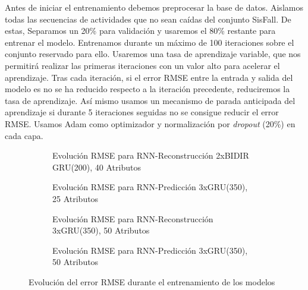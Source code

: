 Antes de iniciar el entrenamiento debemos preprocesar la base de datos. Aislamos todas las secuencias de actividades que no sean caídas del conjunto SisFall. De estas, Separamos un 20\% para validación y usaremos el 80\% restante para entrenar el modelo. Entrenamos durante un máximo de 100 iteraciones sobre el conjunto reservado para ello. Usaremos una tasa de aprendizaje variable, que nos permitirá realizar las primeras iteraciones con un valor alto para acelerar el aprendizaje. Tras cada iteración, si el error RMSE entre la entrada y salida del modelo es no se ha reducido respecto a la iteración precedente, reduciremos la tasa de aprendizaje. Así mismo usamos un mecanismo de parada anticipada del aprendizaje si durante 5 iteraciones seguidas no se consigue reducir el error RMSE. Usamos Adam como optimizador y normalización por \textit{dropout} (20\%) en cada capa. 


\begin{figure}[h!t]
  \centering
  \begin{subfigure}[b]{0.48\textwidth}
      \centering
      \caption{\footnotesize \label{fig:rnnTrain:recon:bidir:40}Evolución RMSE para RNN-Reconstrucción 2xBIDIR GRU(200), 40 Atributos}
  \end{subfigure}
\hfill
  \begin{subfigure}[b]{0.48\textwidth}
      \centering
      \caption{\footnotesize \label{fig:rnnTrain:predict:25}Evolución RMSE para RNN-Predicción 3xGRU(350), 25 Atributos\\}
  \end{subfigure}
  
  \begin{subfigure}[b]{0.49\textwidth}
      \centering
      \caption{\footnotesize \label{fig:rnnTrain:recon:50}Evolución RMSE para RNN-Reconstrucción 3xGRU(350), 50 Atributos}
  \end{subfigure}
  \hfill
  \begin{subfigure}[b]{0.49\textwidth}
      \centering
      \caption{\footnotesize \label{fig:modelo:rnnTrain:predict:50}Evolución RMSE para RNN-Predicción 3xGRU(350), 50 Atributos}
  \end{subfigure}
  \caption{\label{fig:rnn:training} Evolución del error RMSE durante el entrenamiento de los modelos}
\end{figure}


